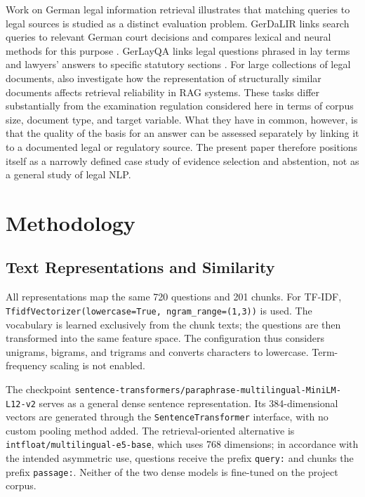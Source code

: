 \documentclass[11pt]{article}
\begin{document}
Work on German legal information retrieval illustrates that matching queries to legal sources is studied as a distinct evaluation problem. GerDaLIR links search queries to relevant German court decisions and compares lexical and neural methods for this purpose \citep{wrzalik-krechel-2021-gerdalir}. GerLayQA links legal questions phrased in lay terms and lawyers' answers to specific statutory sections \citep{buttner-habernal-2024-answering}. For large collections of legal documents, \citet{reuter-etal-2025-towards} also investigate how the representation of structurally similar documents affects retrieval reliability in RAG systems. These tasks differ substantially from the examination regulation considered here in terms of corpus size, document type, and target variable. What they have in common, however, is that the quality of the basis for an answer can be assessed separately by linking it to a documented legal or regulatory source. The present paper therefore positions itself as a narrowly defined case study of evidence selection and abstention, not as a general study of legal NLP.


\section{Methodology}

\subsection{Text Representations and Similarity}

All representations map the same 720 questions and 201 chunks. For TF-IDF, \texttt{TfidfVectorizer(lowercase=True, ngram\_range=(1,3))} is used. The vocabulary is learned exclusively from the chunk texts; the questions are then transformed into the same feature space. The configuration thus considers unigrams, bigrams, and trigrams and converts characters to lowercase. Term-frequency scaling is not enabled.

The checkpoint \nolinkurl{sentence-transformers/paraphrase-multilingual-MiniLM-L12-v2} serves as a general dense sentence representation. Its 384-dimensional vectors are generated through the \texttt{SentenceTransformer} interface, with no custom pooling method added. The retrieval-oriented alternative is \texttt{intfloat/multilingual-e5-base}, which uses 768 dimensions; in accordance with the intended asymmetric use, questions receive the prefix \texttt{query:} and chunks the prefix \texttt{passage:}. Neither of the two dense models is fine-tuned on the project corpus.
\end{document}
